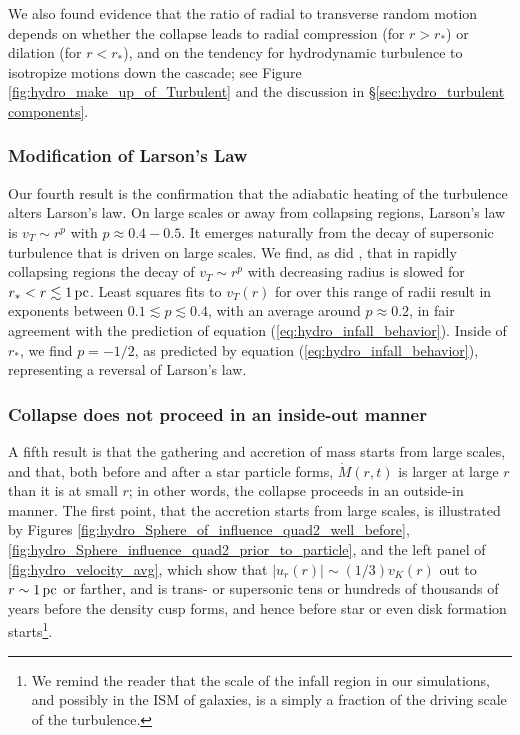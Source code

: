 \documentclass[../dissertation.tex]{subfiles}
\begin{document}
We also found evidence that the ratio of radial to transverse
random motion depends on whether the collapse leads to radial
compression (for $r>r_*$) or dilation (for $r<r_*$), and on the
tendency for hydrodynamic turbulence to isotropize motions down the
cascade; see Figure \ref{fig:hydro_make_up_of_Turbulent} and the
discussion in \S \ref{sec:hydro_turbulent components}.

\subsubsection{Modification of Larson's Law}\label{sec:hydro_modification larson}
Our fourth result is the confirmation that the adiabatic heating of the turbulence 
alters Larson's law. On large scales or away from collapsing regions, Larson's 
law is $v_T\sim r^p$ with $p\approx 0.4-0.5$. It emerges naturally from the 
decay of supersonic turbulence that is driven on large scales.  We find, as did
\citet{2015ApJ...800...49L}, that in rapidly collapsing regions the decay of 
$v_T\sim r^p$ with decreasing radius is slowed for $r_*<r\lesssim 1\,\rm pc$. 
Least squares fits to $v_T(r)$ for over this range of radii result in 
exponents between $0.1\lesssim p\lesssim 0.4$, with an average around 
$p\approx 0.2$, in fair agreement with the prediction of equation (\ref{eq:hydro_infall_behavior}). Inside of $r_*$, we find $p=-1/2$, as predicted by equation (\ref{eq:hydro_infall_behavior}), representing a reversal of Larson's law. 

\subsubsection{Collapse does not proceed in an inside-out manner}

A fifth result is that the gathering and accretion of mass starts from large scales, 
and that, both before and after a star particle forms, $\dot M(r,t)$ is larger at 
large $r$ than it is at small $r$; in other words, the collapse proceeds in an outside-in manner.
The first point, that the accretion starts from large scales, is illustrated by 
Figures \ref{fig:hydro_Sphere_of_influence_quad2_well_before},
\ref{fig:hydro_Sphere_influence_quad2_prior_to_particle}, and the left panel of
\ref{fig:hydro_velocity_avg}, which show that $|u_r(r)|\sim (1/3) v_K(r)$ out to $r\sim 1\,\rm pc$ or
farther, and is trans- or supersonic tens or hundreds of thousands of years before the
density cusp forms, and hence before star or even disk formation 
starts\footnote{We remind the 
reader that the scale of the infall region in our simulations, and possibly in the ISM of
galaxies, is a simply a fraction of the driving scale of the turbulence.}.
\end{document}
